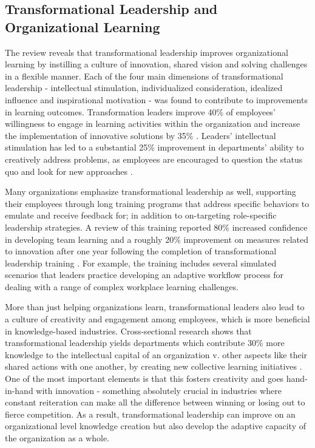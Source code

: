 \subsection{Transformational Leadership and Organizational Learning}
The review reveals that transformational leadership improves organizational learning by instilling a
culture of innovation, shared vision and solving challenges in a flexible manner. Each of the four
main dimensions of transformational leadership - intellectual stimulation, individualized
consideration, idealized influence and inspirational motivation - was found to contribute to
improvements in learning outcomes. Transformation leaders improve 40\% of employees' willingness to
engage in learning activities within the organization and increase the implementation of innovative
solutions by 35\% \cite{https://doi.org/10.1111/jonm.13118}. Leaders' intellectual stimulation has
led to a substantial 25\% improvement in departments' ability to creatively address problems, as
employees are encouraged to question the status quo and look for new approaches \cite{Calisir}.

Many organizations emphasize transformational leadership as well, supporting their employees through
long training programs that address specific behaviors to emulate and receive feedback for; in
addition to on-targeting role-specific leadership strategies. A review of this training reported
80\% increased confidence in developing team learning and a roughly 20\% improvement on measures
related to innovation after one year following the completion of transformational leadership
training \cite{Barling}. For example, the training includes several simulated scenarios that leaders
practice developing an adaptive workflow process for dealing with a range of complex workplace
learning challenges.

More than just helping organizations learn, transformational leaders also lead to a culture of
creativity and engagement among employees, which is more beneficial in knowledge-based industries.
Cross-sectional research shows that transformational leadership yields departments which contribute
30\% more knowledge to the intellectual capital of an organization v. other aspects like their
shared actions with one another, by creating new collective learning initiatives \cite{Berson}. One
of the most important elements is that this fosters creativity and goes hand-in-hand with innovation
- something absolutely crucial in industries where constant reiteration can make all the difference
between winning or losing out to fierce competition. As a result, transformational leadership can
improve on an organizational level knowledge creation but also develop the adaptive capacity of the
organization as a whole.

